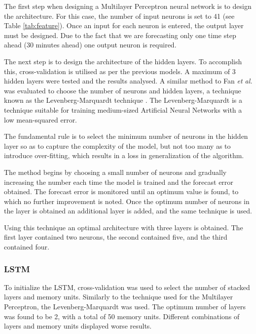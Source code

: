 The first step when designing a Multilayer Perceptron neural network is to design the architecture. For this case, the number of input neurons is set to 41 (see Table \ref{tab:feature}). Once an input for each neuron is entered, the output layer must be designed. Due to the fact that we are forecasting only one time step ahead (30 minutes ahead) one output neuron is required.

The next step is to design the architecture of the hidden layers. To accomplish this, cross-validation is utilised as per the previous models. A maximum of 3 hidden layers were tested and the results analysed. A similar method to Fan \textit{et al.} was evaluated to choose the number of neurons and hidden layers, a technique known as the Levenberg-Marquardt technique \cite{Fan2009}. The Levenberg-Marquardt is a technique suitable for training medium-sized Artificial Neural Networks with a low mean-squared error. 

The fundamental rule is to select the minimum number of neurons in the hidden layer so as to capture the complexity of the model, but not too many as to introduce over-fitting, which results in a loss in generalization of the algorithm.

The method begins by choosing a small number of neurons and gradually increasing the number each time the model is trained and the forecast error obtained. The forecast error is monitored until an optimum value is found, to which no further improvement is noted. Once the optimum number of neurons in the layer is obtained an additional layer is added, and the same technique is used.

Using this technique an optimal architecture with three layers is obtained. The first layer contained two neurons, the second contained five, and the third contained four.



\subsubsection{LSTM}

To initialize the LSTM, cross-validation was used to select the number of stacked layers and memory units. Similarly to the technique used for the Multilayer Perceptron, the Levenberg-Marquardt was used. The optimum number of layers was found to be 2, with a total of 50 memory units. Different combinations of layers and memory units displayed worse results.



